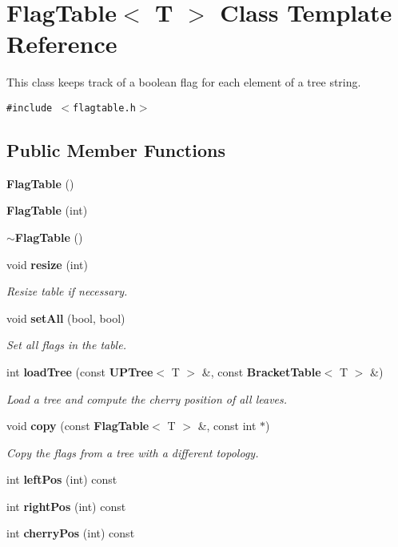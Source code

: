 \section{Flag\-Table$<$ T $>$ Class Template Reference}
\label{classFlagTable}
This class keeps track of a boolean flag for each element of a tree string.  


{\tt \#include $<$flagtable.h$>$}

\subsection*{Public Member Functions}
\begin{CompactItemize}
\item 
{\bf Flag\-Table} ()
\item 
{\bf Flag\-Table} (int)
\item 
{\bf $\sim$Flag\-Table} ()
\item 
void {\bf resize} (int)
\begin{CompactList}\small\item\em Resize table if necessary. \item\end{CompactList}\item 
void {\bf set\-All} (bool, bool)
\begin{CompactList}\small\item\em Set all flags in the table. \item\end{CompactList}\item 
int {\bf load\-Tree} (const {\bf UPTree}$<$ T $>$ \&, const {\bf Bracket\-Table}$<$ T $>$ \&)
\begin{CompactList}\small\item\em Load a tree and compute the cherry position of all leaves. \item\end{CompactList}\item 
void {\bf copy} (const {\bf Flag\-Table}$<$ T $>$ \&, const int $\ast$)
\begin{CompactList}\small\item\em Copy the flags from a tree with a different topology. \item\end{CompactList}\item 
int {\bf left\-Pos} (int) const 
\item 
int {\bf right\-Pos} (int) const 
\item 
int {\bf cherry\-Pos} (int) const 

\end{CompactItemize}
